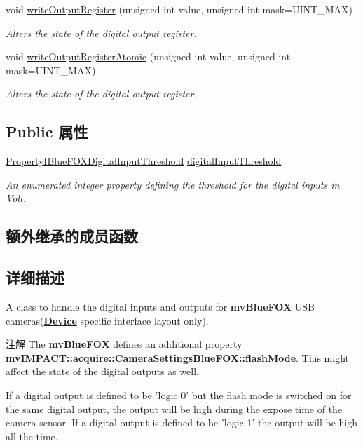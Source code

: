 \begin{DoxyCompactItemize}
void \hyperlink{classmv_i_m_p_a_c_t_1_1acquire_1_1_i_o_sub_system_blue_f_o_x_ace2cc014147d336748bd3529d7bae059}{write\+Output\+Register} (unsigned int value, unsigned int mask=U\+I\+N\+T\+\_\+\+M\+A\+X)
\begin{DoxyCompactList}\small\item\em Alters the state of the digital output register. \end{DoxyCompactList}\item 
void \hyperlink{classmv_i_m_p_a_c_t_1_1acquire_1_1_i_o_sub_system_blue_f_o_x_a76a4bbf81a38ee82348cf08b7750835a}{write\+Output\+Register\+Atomic} (unsigned int value, unsigned int mask=U\+I\+N\+T\+\_\+\+M\+A\+X)
\begin{DoxyCompactList}\small\item\em Alters the state of the digital output register. \end{DoxyCompactList}\end{DoxyCompactItemize}
\subsection*{Public 属性}
\begin{DoxyCompactItemize}
\item 
\hyperlink{group___device_specific_interface_gaa4592c9a62ecce3e3c51143034217bfd}{Property\+I\+Blue\+F\+O\+X\+Digital\+Input\+Threshold} \hyperlink{classmv_i_m_p_a_c_t_1_1acquire_1_1_i_o_sub_system_blue_f_o_x_ab091e761b1045dbe668c16019cfe8292}{digital\+Input\+Threshold}
\begin{DoxyCompactList}\small\item\em An enumerated integer property defining the threshold for the digital inputs in Volt. \end{DoxyCompactList}\end{DoxyCompactItemize}
\subsection*{额外继承的成员函数}


\subsection{详细描述}
A class to handle the digital inputs and outputs for {\bfseries mv\+Blue\+F\+O\+X} U\+S\+B cameras({\bfseries \hyperlink{classmv_i_m_p_a_c_t_1_1acquire_1_1_device}{Device}} specific interface layout only). 

\begin{DoxyNote}{注解}
The {\bfseries mv\+Blue\+F\+O\+X} defines an additional property {\bfseries \hyperlink{classmv_i_m_p_a_c_t_1_1acquire_1_1_camera_settings_blue_f_o_x_a5313c4dc12dd4b6bd30a2dbaef0f8436}{mv\+I\+M\+P\+A\+C\+T\+::acquire\+::\+Camera\+Settings\+Blue\+F\+O\+X\+::flash\+Mode}}. This might affect the state of the digital outputs as well.
\end{DoxyNote}
If a digital output is defined to be 'logic 0' but the flash mode is switched on for the same digital output, the output will be high during the expose time of the camera sensor. If a digital output is defined to be 'logic 1' the output will be high all the time.

